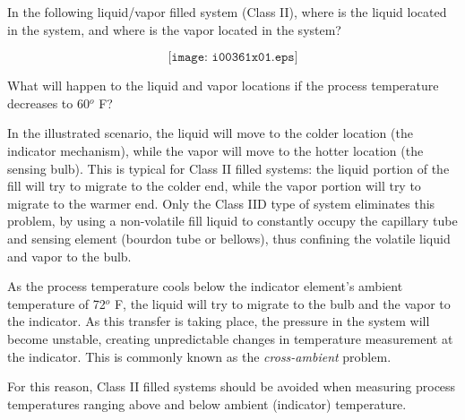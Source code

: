 

In the following liquid/vapor filled system (Class II), where is the liquid located in the system, and where is the vapor located in the system?

$$\texttt{[image: i00361x01.eps]}$$

What will happen to the liquid and vapor locations if the process temperature decreases to 60$^{o}$ F?







In the illustrated scenario, the liquid will move to the colder location (the indicator mechanism), while the vapor will move to the hotter location (the sensing bulb).  This is typical for Class II filled systems: the liquid portion of the fill will try to migrate to the colder end, while the vapor portion will try to migrate to the warmer end.  Only the Class IID type of system eliminates this problem, by using a non-volatile fill liquid to constantly occupy the capillary tube and sensing element (bourdon tube or bellows), thus confining the volatile liquid and vapor to the bulb.

\vskip 10pt

As the process temperature cools below the indicator element's ambient temperature of 72$^{o}$ F, the liquid will try to migrate to the bulb and the vapor to the indicator.  As this transfer is taking place, the pressure in the system will become unstable, creating unpredictable changes in temperature measurement at the indicator.  This is commonly known as the {\it cross-ambient} problem.

For this reason, Class II filled systems should be avoided when measuring process temperatures ranging above and below ambient (indicator) temperature.











